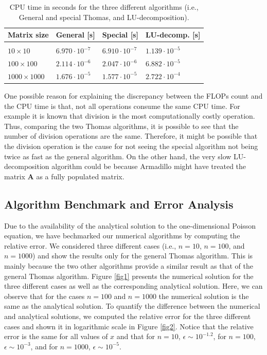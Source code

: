\documentclass[a4paper]{article}
\begin{document}
\begin{table}[ht]
\begin{center}
  \begin{tabular}{| l | l | l | l |}
  \hline
    Matrix size &  General [s] & Special [s] & LU-decomp. [s]\\[0.10cm]\hline\hline
     & & & \\
     $10\times10$ & $6.970\cdot10^{-7}$ & $6.910\cdot10^{-7}$ & $1.139\cdot10^{-5}$\\[0.10cm]
    $100\times100$ & $2.114\cdot10^{-6}$ & $2.047\cdot10^{-6}$& $6.882\cdot10^{-5}$\\[0.10cm]
     $1000\times1000$ & $1.676\cdot10^{-5}$& $1.577\cdot10^{-5}$& $2.722\cdot10^{-4}$\\[0.10cm]
     \hline
  \end{tabular}
\end{center}
\caption{CPU time in seconds for the three different algorithms (i.e., General and special Thomas, and LU-decomposition).}
\label{CPU}
\end{table}

One possible reason for explaining the discrepancy between the FLOPs count and the CPU time is that, not all operations consume the same CPU time. For example it is known that division is the most computationally costly operation. Thus, comparing the two Thomas algorithms, it is possible to see that the number of division operations are the same. Therefore, it might be possible that the division operation is the cause for not seeing the special algorithm not being twice as fast as the general algorithm. On the other hand, the very slow LU-decomposition algorithm could be because Armadillo might have treated the matrix $\mathbf{A}$ as a fully populated matrix.

\subsection{Algorithm Benchmark and Error Analysis}
Due to the availability of the analytical solution to the one-dimensional Poisson equation, we have bechmarked our numerical algorithms by computing the relative error. We considered three different cases (i.e., $n=10$, $n=100$, and $n=1000$) and show the results only for the general Thomas algorithm. This is mainly because the two other algorithms provide a similar result as that of the general Thomas algorithm. Figure \ref{fig1} presents the numerical solution for the three different cases as well as the corresponding analytical solution. Here, we can observe that for the cases $n=100$ and $n=1000$ the numerical solution is the same as the analytical solution. To quantify the difference between the numerical and analytical solutions, we computed the relative error for the three different cases and shown it in logarithmic scale in Figure \ref{fig2}. Notice that the relative error is the same for all values of $x$ and that for $n=10$, $\epsilon \sim 10^{-1.2}$, for $n=100$, $\epsilon \sim 10^{-3}$, and for $n=1000$, $\epsilon \sim 10^{-5}$.
\end{document}

